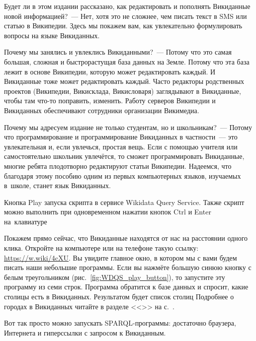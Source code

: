 

Будет ли в этом издании рассказано, 
как редактировать и пополнять Викиданные новой информацией?~--- Нет, 
хотя это не сложнее, чем писать текст в SMS или статью в Википедии. 
Здесь мы покажем вам, как увлекательно формулировать вопросы на языке Викиданных. 


Почему мы занялись и увлеклись Викиданными?~--- Потому что это самая большая, сложная 
и быстрорастущая база данных на Земле. 
Потому что эта база лежит в основе Википедии, которую может редактировать каждый.
И Викиданные тоже может редактировать каждый. 
Часто редакторы родственных проектов (Википедии, Викисклада, Викисловаря) 
заглядывают в Викиданные, чтобы там что-то поправить, изменить. 
Работу серверов Википедии и Викиданных обеспечивают сотрудники организации Викимедиа. 



Почему мы адресуем издание не только студентам, но и школьникам?~--- Потому что 
программирование и программирование Викиданных в частности~--- это 
увлекательная и, если увлечься, простая вещь. 
Если с помощью учителя или самостоятельно школьник увлечётся, 
то сможет программировать Викиданные, 
многие ребята плодотворно редактируют статьи Википедии. 
Надеемся, что благодаря этому пособию одним из первых компьютерных языков, 
изучаемых в~школе, станет язык Викиданных.



\newpage
\begin{marginfigure}%
{
\setlength{\fboxsep}{0pt}%
\setlength{\fboxrule}{1pt}%
}
\caption[Выполнение скрипта в сервисе Wikidata Query Service.]{Кнопка Play запуска скрипта в сервисе Wikidata Query Service. Также скрипт можно выполнить при одновременном нажатии кнопок Ctrl и Enter на~клавиатуре}%
\label{fig:WDQS_play_button}%
\end{marginfigure}%
Покажем прямо сейчас, что Викиданные находятся от нас на расстоянии одного клика.
Откройте на компьютере или на телефоне такую ссылку: 
\url{https://w.wiki/4cXU}. 
Вы увидите главное окно, в котором мы с вами будем писать наши небольшие программы. 
Если вы нажмёте большую синюю кнопку с белым треугольником (рис.~\ref{fig:WDQS_play_button}), 
то запустите эту программу из семи строк. 
Программа обратится к базе данных 
и спросит, какие столицы есть в Викиданных. Результатом будет список столиц %
%
Подробнее о городах в Викиданных читайте в разделе <<>> на с.~\pageref{ch:city}. 

Вот так просто можно запускать SPARQL-программы: достаточно браузера, 
Интернета и гиперссылки с запросом к Викиданным.



